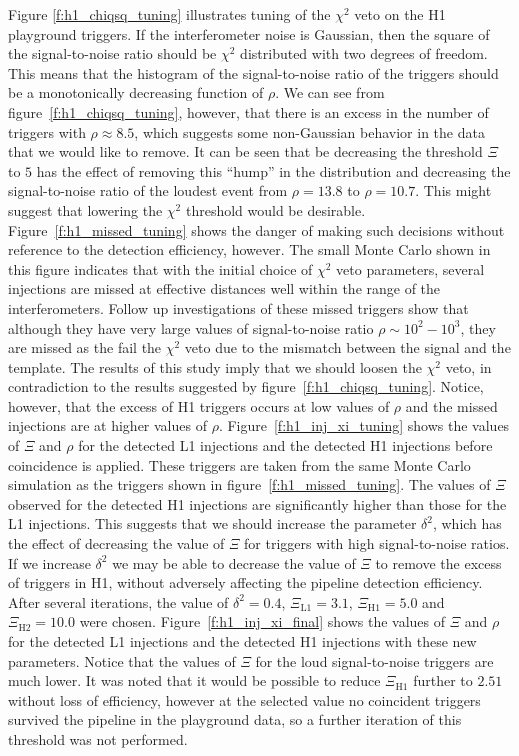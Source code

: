 Figure \ref{f:h1_chiqsq_tuning} illustrates tuning of the $\chi^2$ veto on the
H1 playground triggers. If the interferometer noise is Gaussian, then the
square of the signal-to-noise ratio should be $\chi^2$ distributed with two
degrees of freedom. This means that the histogram of the signal-to-noise ratio
of the triggers should be a monotonically decreasing function of $\rho$. We
can see from figure~\ref{f:h1_chiqsq_tuning}, however, that there is an excess
in the number of triggers with $\rho \approx 8.5$, which suggests some
non-Gaussian behavior in the data that we would like to remove. It can be seen
that be decreasing the threshold $\Xi$ to $5$ has the effect of removing this
``hump'' in the distribution and decreasing the signal-to-noise ratio of the
loudest event from $\rho = 13.8$ to $\rho = 10.7$. This might suggest that
lowering the $\chi^2$ threshold would be desirable.
Figure~\ref{f:h1_missed_tuning} shows the danger of making such decisions
without reference to the detection efficiency, however. The small Monte Carlo
shown in this figure indicates that with the initial choice of $\chi^2$ veto
parameters, several injections are missed at effective distances well within
the range of the interferometers. Follow up investigations of these missed
triggers show that although they have very large values of signal-to-noise
ratio $\rho \sim 10^2 - 10^3$, they are missed as the fail the $\chi^2$ veto
due to the mismatch between the signal and the template.  The results of this
study imply that we should loosen the $\chi^2$ veto, in contradiction to the
results suggested by figure~\ref{f:h1_chiqsq_tuning}.  Notice, however, that
the excess of H1 triggers occurs at low values of $\rho$ and the missed
injections are at higher values of $\rho$. Figure~\ref{f:h1_inj_xi_tuning} 
shows the values of $\Xi$ and $\rho$ for the detected L1 injections and the
detected H1 injections before coincidence is applied. These triggers are taken
from the same Monte Carlo simulation as the triggers shown in
figure~\ref{f:h1_missed_tuning}. The values of $\Xi$ observed for the
detected H1 injections are significantly higher than those for the L1
injections. This suggests that we should increase the parameter $\delta^2$,
which has the effect of decreasing the value of $\Xi$ for triggers with high
signal-to-noise ratios. If we increase $\delta^2$ we may be able to decrease
the value of $\Xi$ to remove the excess of triggers in H1, without adversely
affecting the pipeline detection efficiency. After several iterations, the
value of $\delta^2 = 0.4$, $\Xi_\mathrm{L1} = 3.1$, $\Xi_\mathrm{H1} = 5.0$
and $\Xi_\mathrm{H2} = 10.0$ were chosen.  Figure~\ref{f:h1_inj_xi_final}
shows the values of $\Xi$ and $\rho$ for the detected L1 injections and the
detected H1 injections with these new parameters. Notice that the values of
$\Xi$ for the loud signal-to-noise triggers are much lower. It was noted that
it would be possible to reduce $\Xi_\mathrm{H1}$ further to $2.51$ without
loss of efficiency, however at the selected value no coincident triggers
survived the pipeline in the playground data, so a further iteration of this
threshold was not performed.

